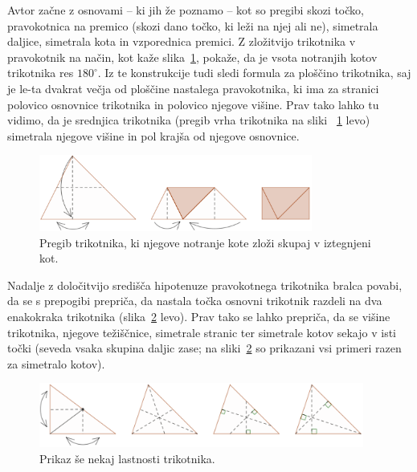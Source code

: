 Avtor začne z osnovami -- ki jih že poznamo -- kot so pregibi skozi točko, pravokotnica na premico (skozi dano točko, ki leži na njej ali ne), simetrala daljice, simetrala kota in vzporednica premici. Z zložitvijo trikotnika v pravokotnik na način, kot kaže slika~\ref{fig:trikotnik_vsota_kotov}, pokaže, da je vsota notranjih kotov trikotnika res $180^\circ$. Iz te konstrukcije tudi sledi formula za ploščino trikotnika, saj je le-ta dvakrat večja od ploščine nastalega pravokotnika, ki ima za stranici polovico osnovnice trikotnika in polovico njegove višine. Prav tako lahko tu vidimo, da je srednjica trikotnika (pregib vrha trikotnika na sliki ~\ref{fig:trikotnik_vsota_kotov} levo) simetrala njegove višine in pol krajša od njegove osnovnice.

\begin{figure}[h]
    \centering
    \includegraphics[width=0.8\textwidth]{images/osnovnosolski_prikazi/trikotnik_vsota_kotov.png}
    \caption[Vsota notranjih kotov trikotnika]{Pregib trikotnika, ki njegove notranje kote zloži skupaj v iztegnjeni kot.}
    \label{fig:trikotnik_vsota_kotov}
\end{figure}

Nadalje z določitvijo središča hipotenuze pravokotnega trikotnika bralca povabi, da se s prepogibi prepriča, da nastala točka osnovni trikotnik razdeli na dva enakokraka trikotnika (slika~\ref{fig:trikotnik_vec_lastnosti} levo). Prav tako se lahko prepriča, da se višine trikotnika, njegove težiščnice, simetrale stranic ter simetrale kotov sekajo v isti točki (seveda vsaka skupina daljic zase; na sliki~\ref{fig:trikotnik_vec_lastnosti} so prikazani vsi primeri razen za simetralo kotov).

\begin{figure}[h]
    \centering
    \includegraphics[width=0.95\textwidth]{images/osnovnosolski_prikazi/vec_lastnosti1.png}
    \caption[Pregibi kot dokaz lastnosti trikotnika]{Prikaz še nekaj lastnosti trikotnika.}
    \label{fig:trikotnik_vec_lastnosti}
\end{figure}

